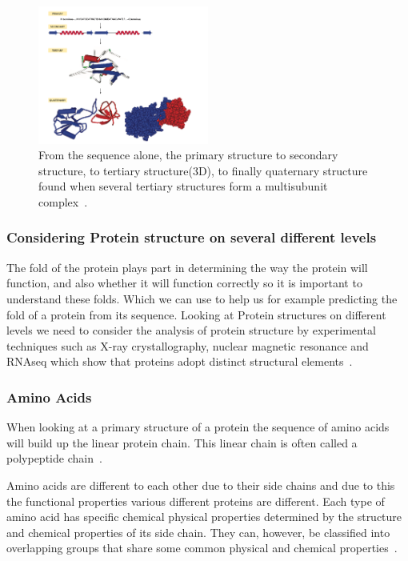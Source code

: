 \documentclass{report}
\begin{document}
\begin{figure}[H]
    \centering
    \includegraphics[width=0.5\textwidth]{Protein Structure.png}
    \caption{\label{fig:levels of protein structure.}From the sequence alone, the primary structure to secondary structure, to tertiary structure(3D), to finally quaternary structure found when several tertiary structures form a multisubunit complex~\cite{zvelebil_understanding_2008}.}
\end{figure}

\subsubsection{Considering Protein structure on several different levels}

The fold of the protein plays part in determining the way the protein will function, and also whether it will function correctly so it is important to understand these folds. Which we can use to help us for example predicting the fold of a protein from its sequence. Looking at Protein structures on different levels we need to consider the analysis of protein structure by experimental techniques such as X-ray crystallography, nuclear magnetic resonance and RNAseq which show that proteins adopt distinct structural elements~\cite{zvelebil_understanding_2008}.

\subsubsection{Amino Acids}

When looking at a primary structure of a protein the sequence of amino acids will build up the linear protein chain. This linear chain is often called a polypeptide chain~\cite{zvelebil_understanding_2008}.

Amino acids are different to each other due to their side chains and due to this the functional properties various different proteins are different. Each type of amino acid has specific chemical physical properties determined by the structure and chemical properties of its side chain. They can, however, be classified into overlapping groups that share some common physical and chemical properties~\cite{zvelebil_understanding_2008}.
\end{document}
